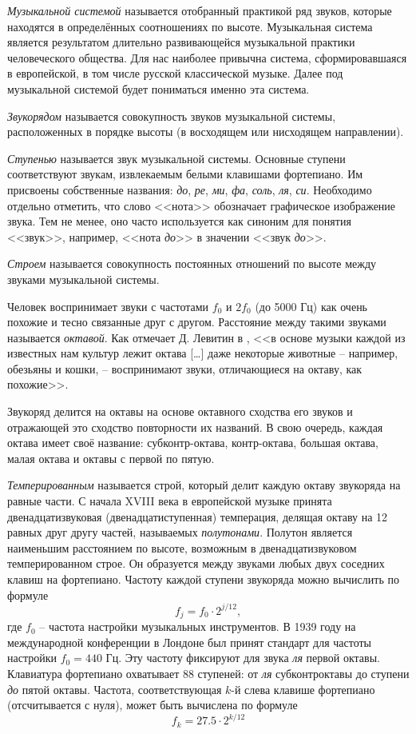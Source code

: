 \emph{Музыкальной системой} называется отобранный практикой ряд звуков, которые
находятся в определённых соотношениях по высоте. Музыкальная система является
результатом длительно развивающейся музыкальной практики человеческого общества.
Для нас наиболее привычна система, сформировавшаяся в европейской, в том числе
русской классической музыке. Далее под музыкальной системой будет пониматься
именно эта система.

\emph{Звукорядом} называется совокупность звуков музыкальной системы,
расположенных в порядке высоты (в восходящем или нисходящем направлении).

\emph{Ступенью} называется звук музыкальной системы. Основные ступени
соответствуют звукам, извлекаемым белыми клавишами фортепиано. Им присвоены
собственные названия: \emph{до}, \emph{ре}, \emph{ми}, \emph{фа}, \emph{соль},
\emph{ля}, \emph{си}. Необходимо отдельно отметить, что слово <<нота>>
обозначает графическое изображение звука. Тем не менее, оно часто используется
как синоним для понятия <<звук>>, например, <<нота \emph{до}>> в значении
<<звук \emph{до}>>.

\emph{Строем} называется совокупность постоянных отношений по высоте между
звуками музыкальной системы.

Человек воспринимает звуки с частотами $f_0$ и $2f_0$ (до 5000 Гц) как очень
похожие и тесно связанные друг с другом. Расстояние между такими звуками
называется \emph{октавой}. Как отмечает Д. Левитин в \cite{Levitin2006}, <<в
основе музыки каждой из известных нам культур лежит октава [\ldots] даже
некоторые животные -- например, обезьяны и кошки, -- воспринимают звуки,
отличающиеся на октаву, как похожие>>.

Звукоряд делится на октавы на основе октавного сходства его звуков и отражающей
это сходство повторности их названий. В свою очередь, каждая октава имеет своё
название: субконтр-октава, контр-октава, большая октава, малая октава и октавы с
первой по пятую.

\emph{Темперированным} называется строй, который делит каждую октаву звукоряда
на равные части. С начала XVIII века в европейской музыке принята
двенадцатизвуковая (двенадцатиступенная) темперация, делящая октаву на 12 равных
друг другу частей, называемых \emph{полутонами}. Полутон является наименьшим
расстоянием по высоте, возможным в двенадцатизвуковом темперированном строе. Он
образуется между звуками любых двух соседних клавиш на фортепиано. Частоту
каждой ступени звукоряда можно вычислить по формуле
\begin{equation}
\label{eq:note_freq}
f_j = f_0 \cdot 2^{j/12},
\end{equation}
где $f_0$ -- частота настройки музыкальных инструментов. В 1939 году на
международной конференции в Лондоне был принят стандарт для частоты настройки
$f_0 = 440$ Гц. Эту частоту фиксируют для звука \emph{ля} первой октавы.
Клавиатура фортепиано охватывает 88 ступеней: от \emph{ля} субконтроктавы до
ступени \emph{до} пятой октавы. Частота, соответствующая $k$-й слева клавише
фортепиано (отсчитывается с нуля), может быть вычислена по формуле $$f_k = 27.5
\cdot 2^{k/12}$$

